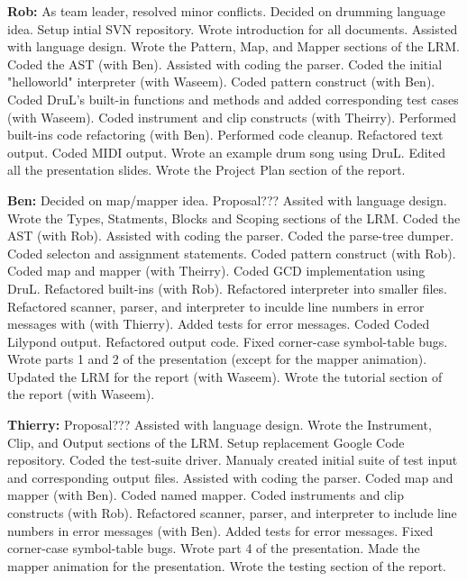 \begin{Itemize}

\item \textbf{Rob:} As team leader, resolved minor conflicts.  Decided on drumming language idea.  Setup intial SVN repository.  Wrote introduction for all documents.  Assisted with language design.  Wrote the Pattern, Map, and Mapper sections of the LRM.  Coded the AST (with Ben).  Assisted with coding the parser.  Coded the initial "helloworld" interpreter (with Waseem).  Coded pattern construct (with Ben).  Coded DruL's built-in functions and methods and added corresponding test cases (with Waseem).  Coded instrument and clip constructs (with Theirry).  Performed built-ins code refactoring (with Ben).  Performed code cleanup.  Refactored text output.  Coded MIDI output.  Wrote an example drum song using DruL.  Edited all the presentation slides.  Wrote the Project Plan section of the report.

\item \textbf{Ben:} Decided on map/mapper idea.  Proposal???  Assited with language design.  Wrote the Types, Statments, Blocks and Scoping sections of the LRM.  Coded the AST (with Rob).  Assisted with coding the parser.  Coded the parse-tree dumper.  Coded selecton and assignment statements.  Coded pattern construct (with Rob).  Coded map and mapper (with Theirry).  Coded GCD implementation using DruL.  Refactored built-ins (with Rob).  Refactored interpreter into smaller files.  Refactored scanner, parser, and interpreter to inculde line numbers in error messages with (with Thierry).  Added tests for error messages.  Coded Coded Lilypond output.  Refactored output code.  Fixed corner-case symbol-table bugs.  Wrote parts 1 and 2 of the presentation (except for the mapper animation).  Updated the LRM for the report (with Waseem).  Wrote the tutorial section of the report (with Waseem).

\item \textbf{Thierry:} Proposal???  Assisted with language design.  Wrote the Instrument, Clip, and Output sections of the LRM.  Setup replacement Google Code repository.  Coded the test-suite driver.  Manualy created initial suite of test input and corresponding output files.  Assisted with coding the parser.  Coded map and mapper (with Ben).  Coded named mapper.  Coded instruments and clip constructs (with Rob).  Refactored scanner, parser, and interpreter to include line numbers in error messages (with Ben).  Added tests for error messages.  Fixed corner-case symbol-table bugs.  Wrote part 4 of the presentation.  Made the mapper animation for the presentation.  Wrote the testing section of the report.


\end{Itemize}

